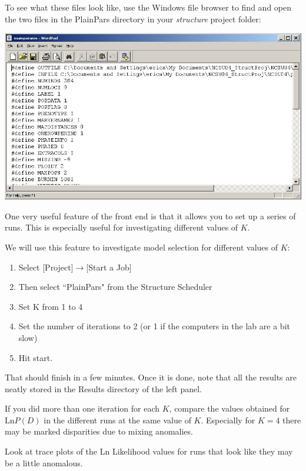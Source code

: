 To see what these files look like, use the Windows file browser to find and open the two files in the PlainPars directory in your {\em structure} project folder:
\begin{center}
\includegraphics[width=.80\textwidth]{illus/mainparams.jpg}
\end{center}


One very useful feature of the front end is that it allows you to set up a series of runs.  This is especially useful for investigating different values of $K$.  

We will use this feature to investigate model selection for different values of $K$:
\begin{enumerate}
\item Select [Project]$\rightarrow$[Start a Job]
\item Then select ``PlainPars" from the Structure Scheduler
\item Set K from 1 to 4
\item Set the number of iterations to 2 (or 1 if the computers in the lab are a bit slow)
\item Hit start.  
\end{enumerate}

That should finish in a few minutes.  Once it is done, note that all the results are neatly stored in the Results directory of the left panel.  

If you did more than one iteration for each $K$, compare the values obtained for $\mathrm{Ln} P(D)$ in the different runs at the same value of $K$.  Especially for $K=4$ there may be marked disparities due to mixing anomalies.  

Look at trace plots of the Ln Likelihood values for runs that look like they may be a little anomalous.

